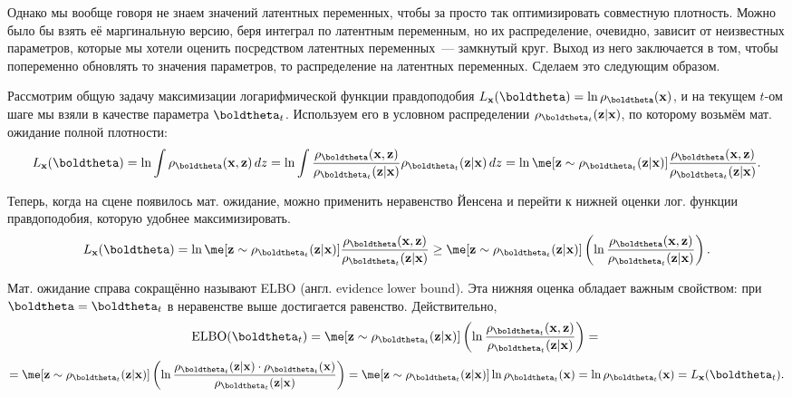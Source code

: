 Однако мы вообще говоря не знаем значений латентных переменных, чтобы за просто так оптимизировать совместную плотность. Можно было бы взять её маргинальную версию, беря интеграл по латентным переменным, но их распределение, очевидно, зависит от неизвестных параметров, которые мы хотели оценить посредством латентных переменных~--- замкнутый круг. Выход из него заключается в том, чтобы попеременно обновлять то значения параметров, то распределение на латентных переменных. Сделаем это следующим образом.

Рассмотрим общую задачу максимизации логарифмической функции правдоподобия $L_{\mathbf x}(\boldtheta) = \ln \rho_{\boldtheta}(\mathbf x)$, и на текущем $t$-ом шаге мы взяли в качестве параметра $\boldtheta_t$. Используем его в условном распределении $\rho_{\boldtheta_t}(\mathbf z | \mathbf x)$, по которому возьмём мат. ожидание полной плотности:
\[
L_{\mathbf x}(\boldtheta) = \ln \int \rho_{\boldtheta}(\mathbf x, \mathbf z)\,dz = \ln \int \frac{\rho_{\boldtheta}(\mathbf x, \mathbf z)}{\rho_{\boldtheta_t}(\mathbf z | \mathbf x)}\rho_{\boldtheta_t}(\mathbf z | \mathbf x)\,dz = \ln \me[\mathbf z \sim \rho_{\boldtheta_t}(\mathbf z | \mathbf x)] \frac{\rho_{\boldtheta}(\mathbf x, \mathbf z)}{\rho_{\boldtheta_t}(\mathbf z | \mathbf x)}.
\]

Теперь, когда на сцене появилось мат. ожидание, можно применить неравенство Йенсена и перейти к нижней оценки лог. функции правдоподобия, которую удобнее максимизировать.
\[
L_{\mathbf x}(\boldtheta) = \ln \me[\mathbf z \sim \rho_{\boldtheta_t}(\mathbf z | \mathbf x)] \frac{\rho_{\boldtheta}(\mathbf x, \mathbf z)}{\rho_{\boldtheta_t}(\mathbf z | \mathbf x)} \ge \me[\mathbf z \sim \rho_{\boldtheta_t}(\mathbf z | \mathbf x)] \left(\ln  \frac{\rho_{\boldtheta}(\mathbf x, \mathbf z)}{\rho_{\boldtheta_t}(\mathbf z | \mathbf x)}\right).
\]

Мат. ожидание справа сокращённо называют ELBO (англ. \textsf{evidence lower bound}). Эта нижняя оценка обладает важным свойством: при $\boldtheta = \boldtheta_t$ в неравенстве выше достигается равенство. Действительно,
\[
\mathrm{ELBO}(\boldtheta_t) = \me[\mathbf z \sim \rho_{\boldtheta_t}(\mathbf z | \mathbf x)] \left(\ln  \frac{\rho_{\boldtheta_t}(\mathbf x, \mathbf z)}{\rho_{\boldtheta_t}(\mathbf z | \mathbf x)}\right) = \\
\]
\[
= \me[\mathbf z \sim \rho_{\boldtheta_t}(\mathbf z | \mathbf x)] \left(\ln  \frac{\rho_{\boldtheta_t}(\mathbf z | \mathbf x) \cdot \rho_{\boldtheta_t}(\mathbf x)}{\rho_{\boldtheta_t}(\mathbf z | \mathbf x)}\right) = \me[\mathbf z \sim \rho_{\boldtheta_t}(\mathbf z | \mathbf x)] \ln \rho_{\boldtheta_t}(\mathbf x) = \ln \rho_{\boldtheta_t}(\mathbf x) = L_{\mathbf x}(\boldtheta_t).
\]

